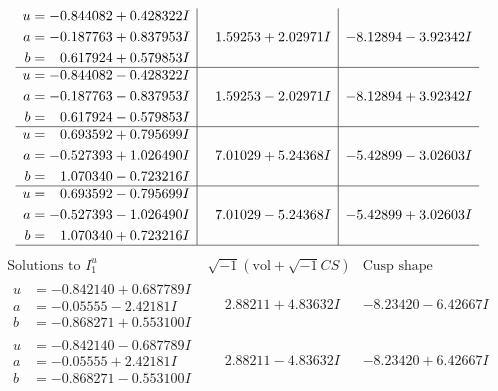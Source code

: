 \documentclass[1p]{elsarticle_modified}
\theoremstyle{definition}
\newcommand{\I}{\sqrt{-1}}
\begin{document}
$$\begin{array}{c|c|c}
\begin{aligned}
u &= -0.844082 + 0.428322 I \\
a &= -0.187763 + 0.837953 I \\
b &= \phantom{-}0.617924 + 0.579853 I\end{aligned}
 & \phantom{-}1.59253 + 2.02971 I & -8.12894 - 3.92342 I \\ \hline\begin{aligned}
u &= -0.844082 - 0.428322 I \\
a &= -0.187763 - 0.837953 I \\
b &= \phantom{-}0.617924 - 0.579853 I\end{aligned}
 & \phantom{-}1.59253 - 2.02971 I & -8.12894 + 3.92342 I \\ \hline\begin{aligned}
u &= \phantom{-}0.693592 + 0.795699 I \\
a &= -0.527393 + 1.026490 I \\
b &= \phantom{-}1.070340 - 0.723216 I\end{aligned}
 & \phantom{-}7.01029 + 5.24368 I & -5.42899 - 3.02603 I \\ \hline\begin{aligned}
u &= \phantom{-}0.693592 - 0.795699 I \\
a &= -0.527393 - 1.026490 I \\
b &= \phantom{-}1.070340 + 0.723216 I\end{aligned}
 & \phantom{-}7.01029 - 5.24368 I & -5.42899 + 3.02603 I\\
 \hline 
 \end{array}$$\newpage$$\begin{array}{c|c|c}  
\text{Solutions to }I^u_{1}& \I (\text{vol} + \sqrt{-1}CS) & \text{Cusp shape}\\
 \hline 
\begin{aligned}
u &= -0.842140 + 0.687789 I \\
a &= -0.05555 - 2.42181 I \\
b &= -0.868271 + 0.553100 I\end{aligned}
 & \phantom{-}2.88211 + 4.83632 I & -8.23420 - 6.42667 I \\ \hline\begin{aligned}
u &= -0.842140 - 0.687789 I \\
a &= -0.05555 + 2.42181 I \\
b &= -0.868271 - 0.553100 I\end{aligned}
 & \phantom{-}2.88211 - 4.83632 I & -8.23420 + 6.42667 I \\ \hline\begin{aligned}

\end{aligned}
\end{array}$$
\end{document}
